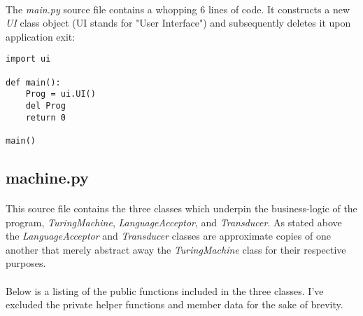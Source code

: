 \documentclass[12pt]{article}
\begin{document}
\paragraph{}
The \textit{main.py} source file contains a whopping 6 lines of code.  It 
constructs a new \textit{UI} class object (UI stands for "User Interface") 
and subsequently deletes it upon application exit:

\begin{lstlisting}
import ui

def main():
    Prog = ui.UI()
    del Prog
    return 0

main()
\end{lstlisting}

\subsection{machine.py}
\paragraph{}
This source file contains the three classes which underpin the business-logic 
of the program, \textit{TuringMachine}, \textit{LanguageAcceptor}, and \textit{
Transducer}.  As stated above the \textit{LanguageAcceptor} and \textit{
Transducer} classes are approximate copies of one another that merely abstract 
away the \textit{TuringMachine} class for their respective purposes.

\paragraph{}
Below is a listing of the public functions included in the three classes.  I've 
excluded the private helper functions and member data for the sake of brevity.
\end{document}
